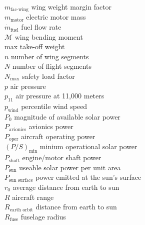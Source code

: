 \begin{multicols}{2}
\begin{tabbing}
$m_{\text{fac-wing}}$ \> wing weight margin factor \\
$m_{\text{motor}}$ \> electric motor mass \\
$\dot{m}_{\text{fuel}}$ \> fuel flow rate \\ %
$\mathcal{M}$ \> wing bending moment \\ %
\DIFdelbegin {}\DIFdelend \DIFaddbegin {}\DIFaddend \> max take-off weight \\ %
$n$ \> number of wing segments \\
$N$ \> number of flight segments \\
$N_{\text{max}}$ \> safety load factor\\
$p$ \> air pressure \\ %
$p_{11}$ \> air pressure at 11,000 meters \\ %
$p_{\text{wind}}$ \> percentile wind speed \\
$P_{0}$ \> magnitude of available solar power \\ %
$P_{\text{avionics}}$ \> avionics power \\ %
$P_{\text{oper}}$ \> aircraft operating power \\ %
$(P/S)_{\text{min}}$ \> minium operational solar power \\ %
$P_{\text{shaft}}$ \> engine/motor shaft power \\ %
$P_{\text{sun}}$ \> useable solar power per unit area \\ %
$P_{\text{sun surface}}$ \> power emitted at the sun's surface \\ %
$r_0$ \> average distance from earth to sun \\
$R$ \> aircraft range \\ %
$R_{\text{earth orbit}}$ \> distance from earth to sun \\
$R_{\text{fuse}}$ \> fuselage radius \\ %

\end{tabbing}
\end{multicols}
